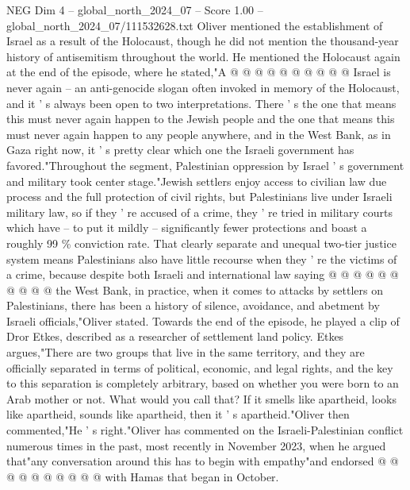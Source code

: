 \begin{textsample}{NEG Dim 4 – global\_north\_2024\_07 – Score 1.00 – global\_north\_2024\_07/111532628.txt}
Oliver mentioned the establishment of Israel as a result of the Holocaust, though he did not mention the thousand-year history of antisemitism throughout the world.
He mentioned the Holocaust again at the end of the episode, where he stated,"A @ @ @ @ @ @ @ @ @ @ Israel is never again -- an anti-genocide slogan often invoked in memory of the Holocaust, and it ' s always been open to two interpretations.
There ' s the one that means this must never again happen to the Jewish people and the one that means this must never again happen to any people anywhere, and in the West Bank, as in Gaza right now, it ' s pretty clear which one the Israeli government has favored."Throughout the segment, Palestinian oppression by Israel ' s government and military took center stage."Jewish settlers enjoy access to civilian law due process and the full protection of civil rights, but Palestinians live under Israeli military law, so if they ' re accused of a crime, they ' re tried in military courts which have -- to put it mildly -- significantly fewer protections and boast a roughly 99 \% conviction rate.
That clearly separate and unequal two-tier justice system means Palestinians also have little recourse when they ' re the victims of a crime, because despite both Israeli and international law saying @ @ @ @ @ @ @ @ @ @ the West Bank, in practice, when it comes to attacks by settlers on Palestinians, there has been a history of silence, avoidance, and abetment by Israeli officials,"Oliver stated.
Towards the end of the episode, he played a clip of Dror Etkes, described as a researcher of settlement land policy.
Etkes argues,"There are two groups that live in the same territory, and they are officially separated in terms of political, economic, and legal rights, and the key to this separation is completely arbitrary, based on whether you were born to an Arab mother or not.
What would you call that?
If it smells like apartheid, looks like apartheid, sounds like apartheid, then it ' s apartheid."Oliver then commented,"He ' s right."Oliver has commented on the Israeli-Palestinian conflict numerous times in the past, most recently in November 2023, when he argued that"any conversation around this has to begin with empathy"and endorsed @ @ @ @ @ @ @ @ @ @ with Hamas that began in October.

\end{textsample}
